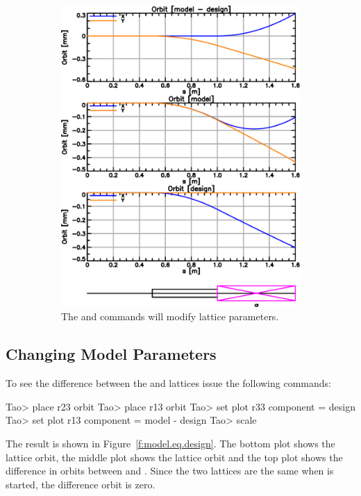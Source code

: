 \documentclass{hitec}
\begin{document}
\begin{figure}[tb]
\begin{subfigure}[b]{0.47\textwidth}
    \includegraphics[width=\textwidth]{changed-model.pdf}
    \caption{The  and  commands will modify  lattice parameters.}
    \label{f:changed.model}
  \end{subfigure}
  \caption{}
\end{figure}

\subsection{Changing Model Parameters}

To see the difference between the  and  lattices issue the following commands:
{\small
\begin{code}
Tao> place r23 orbit
Tao> place r13 orbit
Tao> set plot r33 component = design
Tao> set plot r13 component = model - design
Tao> scale
\end{code}}
The result is shown in Figure~\ref{f:model.eq.design}. The bottom plot shows the  lattice
orbit, the middle plot shows the  lattice orbit and the top plot shows the difference in
orbits between  and . Since the two lattices are the same when \tao is started,
the difference orbit is zero.
\end{document}
